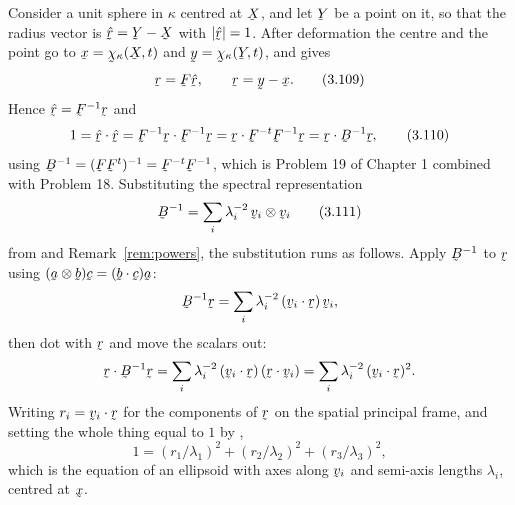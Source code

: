 Consider a unit sphere in $\kappa$ centred at $\bX$, and let $\bY$ be a
point on it, so that the radius vector is $\hat\br=\bY-\bX$ with
$|\hat\br|=1$. After deformation the centre and the point go to
$\bx=\bchi_{\kappa}(\bX,t)$ and $\by=\bchi_{\kappa}(\bY,t)$, and 
gives
\begin{equation}
   \br=\bF\hat\br,\qquad \br=\by-\bx .
   \tag{3.109}\label{eq:3.109}
\end{equation}
Hence $\hat\br=\bF^{-1}\br$ and
\begin{equation}
   1=\ip{\hat\br}{\hat\br}=\ip{\bF^{-1}\br}{\bF^{-1}\br}
    =\ip{\br}{\bF^{-t}\bF^{-1}\br}=\ip{\br}{\bB^{-1}\br},
   \tag{3.110}\label{eq:3.110}
\end{equation}
using $\bB^{-1}=(\bF\bF^{t})^{-1}=\bF^{-t}\bF^{-1}$, which is Problem 19
of Chapter 1 combined with Problem 18. Substituting the spectral
representation
\begin{equation}
   \bB^{-1}=\sum_{i}\lambda_{i}^{-2}\,\bv_{i}\otimes\bv_{i}
   \tag{3.111}\label{eq:3.111}
\end{equation}
from  and Remark~\ref{rem:powers}, the substitution runs as
follows. Apply $\bB^{-1}$ to $\br$ using
$(\ba\otimes\bb)\bc=(\ip\bb\bc)\ba$:
\[
   \bB^{-1}\br=\sum_{i}\lambda_{i}^{-2}\,(\ip{\bv_{i}}{\br})\,\bv_{i},
\]
then dot with $\br$ and move the scalars out:
\[
   \ip{\br}{\bB^{-1}\br}
   =\sum_{i}\lambda_{i}^{-2}\,(\ip{\bv_{i}}{\br})\,(\ip{\br}{\bv_{i}})
   =\sum_{i}\lambda_{i}^{-2}\,(\ip{\bv_{i}}{\br})^{2}.
\]
Writing $r_{i}=\ip{\bv_{i}}{\br}$ for the components of $\br$ on the
spatial principal frame, and setting the whole thing equal to $1$ by
,
\begin{equation}
   1=(r_{1}/\lambda_{1})^{2}+(r_{2}/\lambda_{2})^{2}
    +(r_{3}/\lambda_{3})^{2},
   \tag{3.112}\label{eq:3.112}
\end{equation}
which is the equation of an ellipsoid with axes along $\bv_{i}$ and
semi-axis lengths $\lambda_{i}$, centred at $\bx$.

